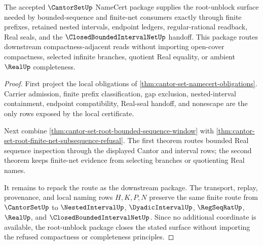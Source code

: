 \begin{theorem}
\label{thm:cantor-set-root-unblock-package}
The accepted $\CantorSetUp$ NameCert package supplies the root-unblock surface needed by bounded-sequence and finite-net consumers exactly through finite prefixes, retained nested intervals, endpoint ledgers, regular-rational readback, Real seals, and the $\ClosedBoundedIntervalNetUp$ handoff. This package routes downstream compactness-adjacent reads without importing open-cover compactness, selected infinite branches, quotient Real equality, or ambient $\RealUp$ completeness.
\end{theorem}
\begin{proof}
First project the local obligations of \autoref{thm:cantor-set-namecert-obligations}. Carrier admission, finite prefix classification, gap exclusion, nested-interval containment, endpoint compatibility, Real-seal handoff, and nonescape are the only rows exposed by the local certificate.

Next combine \autoref{thm:cantor-set-root-bounded-sequence-window} with \autoref{thm:cantor-set-root-finite-net-subsequence-refusal}. The first theorem routes bounded Real sequence inspection through the displayed Cantor and interval rows; the second theorem keeps finite-net evidence from selecting branches or quotienting Real names.

It remains to repack the route as the downstream package. The transport, replay, provenance, and local naming rows $H,K,P,N$ preserve the same finite route from $\CantorSetUp$ to $\NestedIntervalUp$, $\DyadicIntervalUp$, $\RegSeqRatUp$, $\RealUp$, and $\ClosedBoundedIntervalNetUp$. Since no additional coordinate is available, the root-unblock package closes the stated surface without importing the refused compactness or completeness principles.
\end{proof}

